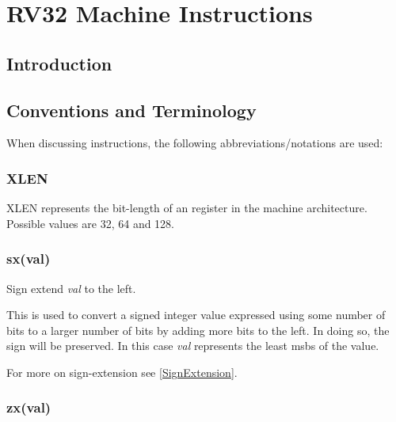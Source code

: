 \chapter{RV32 Machine Instructions}
\label{chapter:RV32}

\section{Introduction}


\section{Conventions and Terminology}

When discussing instructions, the following abbreviations/notations are used:

\subsection{XLEN}

XLEN represents the bit-length of an  register in the machine architecture.
Possible values are 32, 64 and 128.

\subsection{sx(val)}
\label{extension:sx}

Sign extend {\em val} to the left.

This is used to convert a signed integer value expressed using some number of 
bits to a larger number of bits by adding more bits to the left.  In doing so, 
the sign will be preserved.  In this case {\em val} represents the least 
\acrshort{msb}s of the value.  

For more on sign-extension see \autoref{SignExtension}.

\subsection{zx(val)}
\label{extension:zx}


